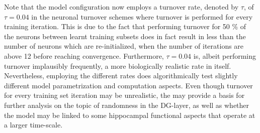 Note that the model configuration now employs a turnover rate, denoted by $\tau$, of $\tau=0.04$ in the neuronal turnover schemes where turnover is performed for every training iteration. This is due to the fact that performing turnover for 50 \% of the neurons between learnt training subsets does in fact result in less than the number of neurons which are re-initialized, when the number of iterations are above 12 before reaching convergence. Furthermore, $\tau=0.04$ is, albeit performing turnover implausibly frequently, a more biologically realistic rate in itself. Nevertheless, employing the different rates does algorithmically test slightly different model parametrization and computation aspects. Even though turnover for every training set iteration may be unrealistic, the may provide a basis for further analysis on the topic of randomness in the DG-layer, as well as whether the model may be linked to some hippocampal functional aspects that operate at a larger time-scale.



